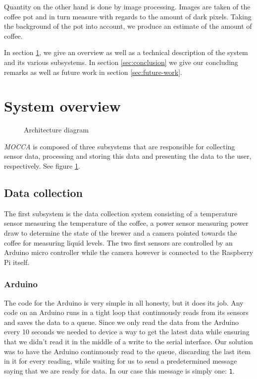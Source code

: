 \documentclass[12pt,a4paper,oneside,article]{memoir}
\numberwithin{equation}{chapter}
\begin{document}
Quantity on the other hand is done by image processing. Images are taken of the
coffee pot and in turn measure with regards to the amount of dark pixels.
Taking the background of the pot into account, we produce an estimate of
the amount of coffee.

In section \ref{sec:system-overview}, we give an overview as well as a technical
description of the system and its various subsystems. In section
\ref{sec:conclusion} we give our concluding remarks as well as future work in
section \ref{sec:future-work}.

\section{System overview}\label{sec:system-overview}
\begin{figure}[h]
  \centerfloat{}
  \scalebox{.75}{}
  \caption{Architecture diagram}\label{fig:architecture}
\end{figure}
\textit{MOCCA} is composed of three subsystems that are responsible for
collecting sensor data, processing and storing this data and presenting the data
to the user, respectively. See figure \ref{fig:architecture}.

\subsection{Data collection}\label{sec:data-collection}
The first subsystem is the data collection system consisting of a temperature
sensor measuring the temperature of the coffee, a power sensor measuring power
draw to determine the state of the brewer and a camera pointed towards the
coffee for measuring liquid levels. The two first sensors are controlled by an
Arduino micro controller while the camera however is connected to the Raspberry
Pi itself.

\subsubsection{Arduino}\label{sec:arduino}
The code for the Arduino is very simple in all honesty, but it does its job. Any
code on an Arduino runs in a tight loop that continuously reads from its sensors
and saves the data to a queue. Since we only read the data from the Arduino
every 10 seconds we needed to device a way to get the latest data while ensuring
that we didn't read it in the middle of a write to the serial interface. Our
solution was to have the Arduino continuously read to the queue, discarding the
last item in it for every reading, while waiting for us to send a predetermined
message saying that we are ready for data. In our case this message is simply
one: \lstinline{1}.
\end{document}
